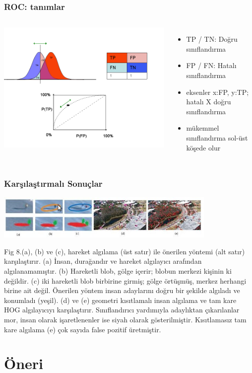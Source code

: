 \documentclass{beamer}
\begin{document}
\begin{frame}
	\frametitle{ROC: tanımlar}

	\begin{columns}
			\includegraphics[width=1.0\textwidth]{img/ROC.png}\label{fig:ROC-def}
			\begin{itemize}
				\item TP / TN: Doğru sınıflandırma
				\item FP / FN: Hatalı sınıflandırma
				\item eksenler x:FP, y:TP; hatalı X doğru sınıflandırma
				\item mükemmel sınıflandırma sol-üst köşede olur
			\end{itemize}
	\end{columns}
\end{frame}

\begin{frame}
	\frametitle{Karşılaştırmalı Sonuçlar}

	\includegraphics[width=0.8\textwidth]{img/fig8.jpg}\label{fig:compare}

	Fig 8.(a), (b) ve (c), hareket algılama (üst satır) ile önerilen yöntemi
	(alt satır) karşılaştırır. (a) İnsan, durağandır ve hareket algılayıcı
	arafından algılanamamıştır. (b) Hareketli blob, gölge içerir; blobun merkezi
	kişinin ki değildir. (c) iki hareketli blob birbirine girmiş; gölge
	örtüşmüş, merkez herhangi birine ait değil. Önerilen yöntem insan adaylarını
	doğru bir şekilde algıladı ve konumladı (yeşil). (d) ve (e) geometri
	kısıtlamalı insan algılama ve tam kare HOG algılayıcıyı karşılaştırır.
	Sınıflandırıcı yardımıyla adaylıktan çıkarılanlar mor, insan olarak
	işaretlenenler ise siyah olarak gösterilmiştir. Kısıtlamasız tam kare
	algılama (e) çok sayıda false pozitif üretmiştir.

\end{frame}

\section{Öneri}
\end{document}
